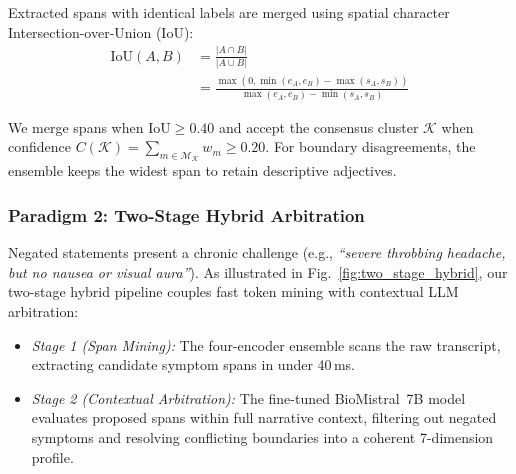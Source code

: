 Extracted spans with identical labels are merged using spatial character Intersection-over-Union (IoU):
\begin{equation}
    \begin{aligned}
        \text{IoU}(A, B) &= \frac{|A \cap B|}{|A \cup B|}\\
        &= \frac{\max(0, \min(e_A, e_B) - \max(s_A, s_B))}{\max(e_A, e_B) - \min(s_A, s_B)}
    \end{aligned}
\end{equation}

We merge spans when $\text{IoU} \ge 0.40$ and accept the consensus cluster $\mathcal{K}$ when confidence $C(\mathcal{K}) = \sum_{m \in \mathcal{M}_{\mathcal{K}}} w_m \ge 0.20$. For boundary disagreements, the ensemble keeps the widest span to retain descriptive adjectives.

\subsubsection{Paradigm 2: Two-Stage Hybrid Arbitration}
Negated statements present a chronic challenge (e.g., \textit{``severe throbbing headache, but no nausea or visual aura''}). As illustrated in Fig.~\ref{fig:two_stage_hybrid}, our two-stage hybrid pipeline couples fast token mining with contextual LLM arbitration:
\begin{itemize}
    \item \textit{Stage 1 (Span Mining):} The four-encoder ensemble scans the raw transcript, extracting candidate symptom spans in under 40\,ms.
    \item \textit{Stage 2 (Contextual Arbitration):} The fine-tuned BioMistral~7B model evaluates proposed spans within full narrative context, filtering out negated symptoms and resolving conflicting boundaries into a coherent 7-dimension profile.
\end{itemize}

